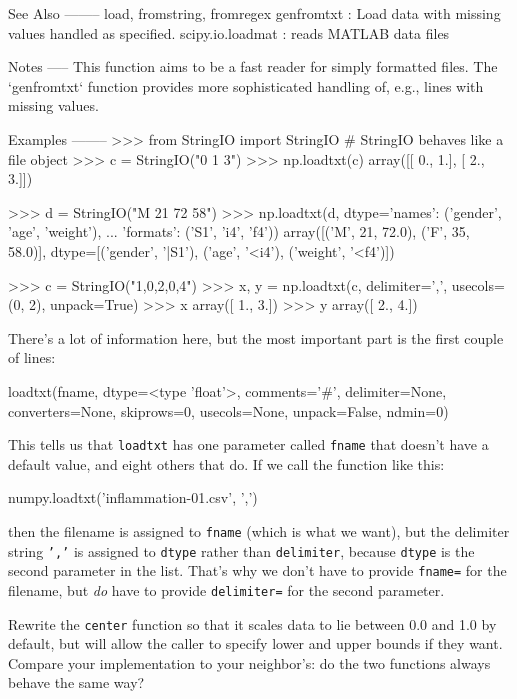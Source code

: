 \documentclass{book}
\begin{document}
\begin{VerbOut}
    See Also
    --------
    load, fromstring, fromregex
    genfromtxt : Load data with missing values handled as specified.
    scipy.io.loadmat : reads MATLAB data files

    Notes
    -----
    This function aims to be a fast reader for simply formatted files.  The
    `genfromtxt` function provides more sophisticated handling of, e.g.,
    lines with missing values.

    Examples
    --------
    >>> from StringIO import StringIO   # StringIO behaves like a file object
    >>> c = StringIO("0 1 3")
    >>> np.loadtxt(c)
    array([[ 0.,  1.],
           [ 2.,  3.]])

    >>> d = StringIO("M 21 72 58")
    >>> np.loadtxt(d, dtype={'names': ('gender', 'age', 'weight'),
    ...                      'formats': ('S1', 'i4', 'f4')})
    array([('M', 21, 72.0), ('F', 35, 58.0)],
          dtype=[('gender', '|S1'), ('age', '<i4'), ('weight', '<f4')])

    >>> c = StringIO("1,0,2,0,4")
    >>> x, y = np.loadtxt(c, delimiter=',', usecols=(0, 2), unpack=True)
    >>> x
    array([ 1.,  3.])
    >>> y
    array([ 2.,  4.])
\end{VerbOut}

There's a lot of information here, but the most important part is the
first couple of lines:

\begin{VerbOut}
loadtxt(fname, dtype=<type 'float'>, comments='#', delimiter=None, converters=None, skiprows=0, usecols=None,
        unpack=False, ndmin=0)
\end{VerbOut}

This tells us that \texttt{loadtxt} has one parameter called
\texttt{fname} that doesn't have a default value, and eight others that
do. If we call the function like this:

\begin{VerbIn}
numpy.loadtxt('inflammation-01.csv', ',')
\end{VerbIn}

then the filename is assigned to \texttt{fname} (which is what we want),
but the delimiter string \texttt{','} is assigned to \texttt{dtype}
rather than \texttt{delimiter}, because \texttt{dtype} is the second
parameter in the list. That's why we don't have to provide
\texttt{fname=} for the filename, but \emph{do} have to provide
\texttt{delimiter=} for the second parameter.

\begin{challenge}
  Rewrite the \texttt{center} function so that it scales data to lie
  between 0.0 and 1.0 by default, but will allow the caller to specify
  lower and upper bounds if they want. Compare your implementation to
  your neighbor's: do the two functions always behave the same way?
\end{challenge}
\end{document}
